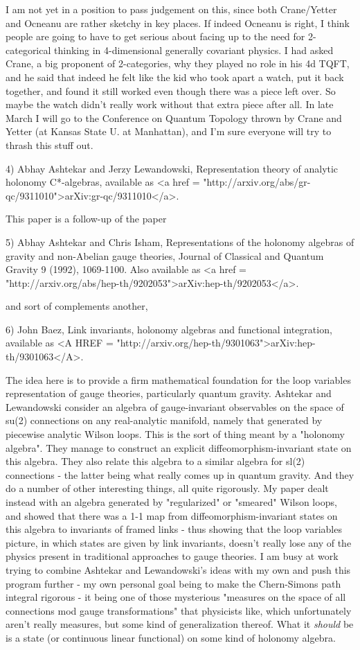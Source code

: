 I am not yet in a position to pass judgement on this, since both
Crane/Yetter and Ocneanu are rather sketchy in key places.  If indeed
Ocneanu is right, I think people are going to have to get serious about
facing up to the need for 2-categorical thinking in 4-dimensional
generally covariant physics.  I had asked Crane, a big proponent of
2-categories, why they played no role in his 4d TQFT, and he said that
indeed he felt like the kid who took apart a watch, put it back
together, and found it still worked even though there was a piece left
over.  So maybe the watch didn't really work without that extra piece
after all.  In late March I will go to the Conference on Quantum Topology
thrown by Crane and Yetter (at Kansas State U. at Manhattan), and I'm
sure everyone will try to thrash this stuff out.  

4) Abhay Ashtekar and Jerzy Lewandowski, Representation theory of
analytic holonomy C*-algebras, available as <a href = "http://arxiv.org/abs/gr-qc/9311010">arXiv:gr-qc/9311010</a>.

This paper is a follow-up of the paper

5) Abhay Ashtekar and Chris Isham, Representations of the holonomy
algebras of gravity and non-Abelian gauge theories, Journal of
Classical and Quantum Gravity 9 (1992), 1069-1100.  Also available
as <a href =
"http://arxiv.org/abs/hep-th/9202053">arXiv:hep-th/9202053</a>.

and sort of complements another,

6) John Baez, Link invariants, holonomy algebras and functional
integration, available as <A HREF =
"http://arxiv.org/hep-th/9301063">arXiv:hep-th/9301063</A>.

The idea here is to provide a firm mathematical foundation for the
loop variables representation of gauge theories, particularly quantum
gravity.  Ashtekar and Lewandowski consider an algebra of
gauge-invariant observables on the space of su(2) connections on any
real-analytic manifold, namely that generated by piecewise analytic
Wilson loops.  This is the sort of thing meant by a "holonomy
algebra".  They manage to construct an explicit
diffeomorphism-invariant state on this algebra.  They also relate this
algebra to a similar algebra for sl(2) connections - the latter being
what really comes up in quantum gravity.  And they do a number of
other interesting things, all quite rigorously.  My paper dealt
instead with an algebra generated by "regularized" or "smeared" Wilson
loops, and showed that there was a 1-1 map from
diffeomorphism-invariant states on this algebra to invariants of
framed links - thus showing that the loop variables picture, in which
states are given by link invariants, doesn't really lose any of the
physics present in traditional approaches to gauge theories.  I am
busy at work trying to combine Ashtekar and Lewandowski's ideas with
my own and push this program further - my own personal goal being to
make the Chern-Simons path integral rigorous - it being one of those
mysterious "measures on the space of all connections mod gauge
transformations" that physicists like, which unfortunately aren't
really measures, but some kind of generalization thereof.  What it
\emph{should} be is a state (or continuous linear functional) on
some kind of holonomy algebra.  


